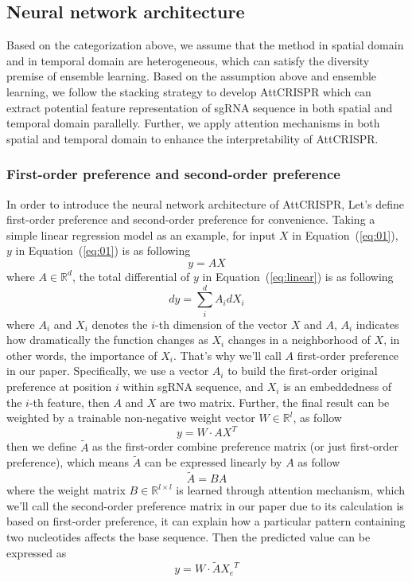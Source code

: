 \documentclass{bioinfo}
\begin{document}
\subsection{Neural network architecture}

Based on the categorization above, we assume that the method in spatial domain and in temporal domain are heterogeneous, 
which can satisfy the diversity premise of ensemble learning. 
Based on the assumption above and ensemble learning, we follow the stacking strategy to develop AttCRISPR 
which can extract potential feature representation of sgRNA sequence in both spatial and temporal domain parallelly. 
Further, we apply attention mechanisms in both spatial and temporal domain to enhance the interpretability of AttCRISPR.

\subsubsection{First-order preference and second-order preference}

In order to introduce the neural network architecture of AttCRISPR, Let's define first-order preference and second-order preference for convenience. 
Taking a simple linear regression model as an example, for input $X$ in Equation~(\ref{eq:01}), $y$ in Equation~(\ref{eq:01}) is as following
 \begin{equation}
y = AX\label{eq:linear}
\end{equation}
where $A \in\mathbb{R}^d$, the total differential of $y$ in Equation~(\ref{eq:linear}) is as following
 \begin{equation}
dy = \sum^{d}_iA_idX_i\label{eq:02}
\end{equation}
where $A_i$ and $X_i$ denotes the $i$-th dimension of the vector $X$ and $A$, 
$A_i$ indicates how dramatically the function changes as $X_i$ changes in a neighborhood of $X$, 
in other words, the importance of $X_i$. 
That's why we'll call $A$ first-order preference in our paper. 
Specifically, we use a vector $A_i$ to build the first-order original preference at position $i$ within sgRNA sequence, 
and $X_i$ is an embeddedness of the $i$-th feature, then $A$ and $X$ are two matrix. 
Further, the final result can be weighted by a trainable non-negative weight vector $W\in\mathbb{R}^l$, as follow
\begin{equation}
y=W \cdot AX^{T}\label{eq:superlinear}
\end{equation}
then we define $\tilde{A}$ as the first-order combine preference matrix (or just first-order preference), which means $\tilde{A}$ can be expressed linearly by $A$ as follow
\begin{equation}
\tilde{A}=BA\label{eq:04}
\end{equation}
where the weight matrix $B\in\mathbb{R}^{l\times l}$ is learned through attention mechanism, 
which we'll call the second-order preference matrix in our paper due to its calculation is based on first-order preference, 
it can explain how a particular pattern containing two nucleotides affects the base sequence. 
Then the predicted value can be expressed as
\begin{equation}
y=W \cdot \tilde{A} {X_e}^{T}\label{eq:05}
\end{equation}
\end{document}
